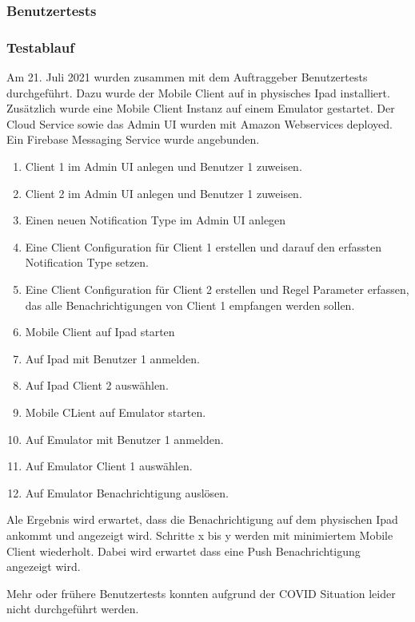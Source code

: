 \subsubsection*{Benutzertests}

\subsubsection*{Testablauf}

Am 21. Juli 2021 wurden zusammen mit dem Auftraggeber Benutzertests durchgeführt.
Dazu wurde der Mobile Client auf in physisches Ipad installiert.
Zusätzlich wurde eine Mobile Client Instanz auf einem Emulator gestartet.
Der Cloud Service sowie das Admin UI wurden mit Amazon Webservices deployed.
Ein Firebase Messaging Service wurde angebunden.

\begin{enumerate}
    \item Client 1 im Admin UI anlegen und Benutzer 1 zuweisen.
    \item Client 2 im Admin UI anlegen und Benutzer 1 zuweisen.
    \item Einen neuen Notification Type im Admin UI anlegen
    \item Eine Client Configuration für Client 1 erstellen und darauf den erfassten Notification Type setzen.
    \item Eine Client Configuration für Client 2 erstellen und Regel Parameter erfassen, das alle Benachrichtigungen von Client 1 empfangen werden sollen.
    \item Mobile Client auf Ipad starten
    \item Auf Ipad mit Benutzer 1 anmelden.
    \item Auf Ipad Client 2 auswählen.
    \item Mobile CLient auf Emulator starten.
    \item Auf Emulator mit Benutzer 1 anmelden.
    \item Auf Emulator Client 1 auswählen.
    \item Auf Emulator Benachrichtigung auslösen.
\end{enumerate}

Ale Ergebnis wird erwartet, dass die Benachrichtigung auf dem physischen Ipad ankommt und angezeigt wird.
Schritte x bis y werden mit minimiertem Mobile Client wiederholt.
Dabei wird erwartet dass eine Push Benachrichtigung angezeigt wird.

Mehr oder frühere Benutzertests konnten aufgrund der COVID Situation leider nicht durchgeführt werden.

